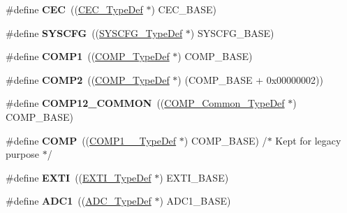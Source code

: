 \begin{DoxyCompactItemize}
\#define {\bfseries C\+EC}~((\hyperlink{struct_c_e_c___type_def}{C\+E\+C\+\_\+\+Type\+Def} $\ast$) C\+E\+C\+\_\+\+B\+A\+SE)
\item 
\mbox{\label{group___peripheral__declaration_ga3c833fe1c486cb62250ccbca32899cb8}} 
\#define {\bfseries S\+Y\+S\+C\+FG}~((\hyperlink{struct_s_y_s_c_f_g___type_def}{S\+Y\+S\+C\+F\+G\+\_\+\+Type\+Def} $\ast$) S\+Y\+S\+C\+F\+G\+\_\+\+B\+A\+SE)
\item 
\mbox{\label{group___peripheral__declaration_gaf5713f83009027d48805b049d55bb01b}} 
\#define {\bfseries C\+O\+M\+P1}~((\hyperlink{struct_c_o_m_p___type_def}{C\+O\+M\+P\+\_\+\+Type\+Def} $\ast$) C\+O\+M\+P\+\_\+\+B\+A\+SE)
\item 
\mbox{\label{group___peripheral__declaration_ga6985fa7e9bb3c2edf15b29b7af210a2b}} 
\#define {\bfseries C\+O\+M\+P2}~((\hyperlink{struct_c_o_m_p___type_def}{C\+O\+M\+P\+\_\+\+Type\+Def} $\ast$) (C\+O\+M\+P\+\_\+\+B\+A\+SE + 0x00000002))
\item 
\mbox{\label{group___peripheral__declaration_ga7c0dbc759386dc94597d1ab7b798e75f}} 
\#define {\bfseries C\+O\+M\+P12\+\_\+\+C\+O\+M\+M\+ON}~((\hyperlink{struct_c_o_m_p___common___type_def}{C\+O\+M\+P\+\_\+\+Common\+\_\+\+Type\+Def} $\ast$) C\+O\+M\+P\+\_\+\+B\+A\+SE)
\item 
\mbox{\label{group___peripheral__declaration_ga076912543697dbe4c46b79e8e44ad2fb}} 
\#define {\bfseries C\+O\+MP}~((\hyperlink{struct_c_o_m_p1__2___type_def}{C\+O\+M\+P1\+\_\+\_\+\+Type\+Def} $\ast$) C\+O\+M\+P\+\_\+\+B\+A\+SE) /$\ast$ Kept for legacy purpose $\ast$/
\item 
\mbox{\label{group___peripheral__declaration_ga9189e770cd9b63dadd36683eb9843cac}} 
\#define {\bfseries E\+X\+TI}~((\hyperlink{struct_e_x_t_i___type_def}{E\+X\+T\+I\+\_\+\+Type\+Def} $\ast$) E\+X\+T\+I\+\_\+\+B\+A\+SE)
\item 
\mbox{\label{group___peripheral__declaration_ga90d2d5c526ce5c0a551f533eccbee71a}} 
\#define {\bfseries A\+D\+C1}~((\hyperlink{struct_a_d_c___type_def}{A\+D\+C\+\_\+\+Type\+Def} $\ast$) A\+D\+C1\+\_\+\+B\+A\+SE)

\end{DoxyCompactItemize}
